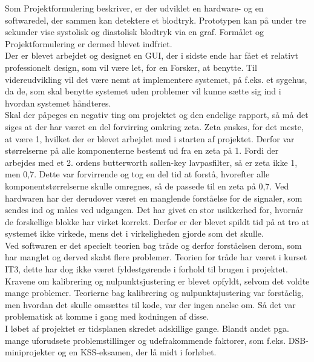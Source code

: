 Som Projektformulering beskriver, er der udviklet en hardware- og en softwaredel, der sammen kan detektere et blodtryk. Prototypen kan på under tre sekunder vise systolisk og diastolisk blodtryk via en graf. Formålet og Projektformulering er dermed blevet indfriet.  \\
Der er blevet arbejdet og designet en GUI, der i sidste ende har fået et relativt professionelt design, som vil være let, for en Forsker, at benytte. Til videreudvikling vil det være nemt at implementere systemet, på f.eks. et sygehus, da de, som skal benytte systemet uden problemer vil kunne sætte sig ind i hvordan systemet håndteres. \\
Skal der påpeges en negativ ting om projektet og den endelige rapport, så må det siges at der har været en del forvirring omkring zeta. Zeta ønskes, for det meste, at være 1, hvilket der er blevet arbejdet med i starten af projektet. Derfor var størrelserne på alle komponenterne bestemt ud fra en zeta på 1. Fordi der arbejdes med et 2. ordens butterworth sallen-key lavpasfilter, så er zeta ikke 1, men 0,7. Dette var forvirrende og tog en del tid at forstå, hvorefter alle komponentstørrelserne skulle omregnes, så de passede til en zeta på 0,7. Ved hardwaren har der derudover været en manglende forståelse for de signaler, som sendes ind og måles ved udgangen. Det har givet en stor usikkerhed for, hvornår de forskellige blokke har virket korrekt. Derfor er der blevet spildt tid på at tro at systemet ikke virkede, mens det i virkeligheden gjorde som det skulle. \\
Ved softwaren er det specielt teorien bag tråde og derfor forståelsen derom, som har manglet og derved skabt flere problemer. Teorien for tråde har været i kurset IT3, dette har dog ikke været fyldestgørende i forhold til brugen i projektet. \\
Kravene om kalibrering og nulpunktsjustering er blevet opfyldt, selvom det voldte mange problemer. Teorierne bag kalibrering og nulpunktsjustering var forståelig, men hvordan det skulle omsættes til kode, var der ingen anelse om. Så det var problematisk at komme i gang med kodningen af disse. \\ 
I løbet af projektet er tidsplanen skredet adskillige gange. Blandt andet pga. mange uforudsete problemstillinger og udefrakommende faktorer, som f.eks. DSB-miniprojekter og en KSS-eksamen, der lå midt i forløbet. \\



